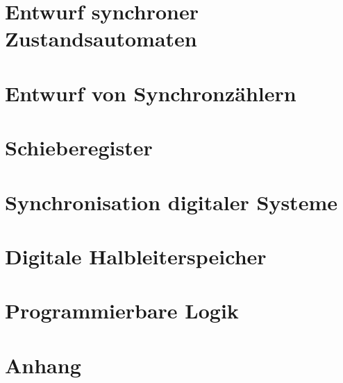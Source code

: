 \section{Entwurf synchroner Zustandsautomaten}

\section{Entwurf von Synchronzählern}

\section{Schieberegister}

\section{Synchronisation digitaler Systeme}

\section{Digitale Halbleiterspeicher}

\section{Programmierbare Logik}

\section{Anhang}

